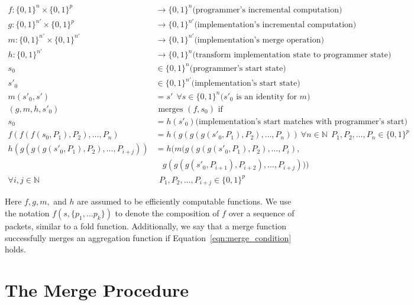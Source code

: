 \begin{align}
f : \{0, 1\}^n \times \{0, 1\}^p & \rightarrow \{0, 1\}^n \mbox{(programmer's incremental computation)} \nonumber \\
g : \{0, 1\}^{n'} \times \{0, 1\}^p  & \rightarrow \{0, 1\}^{n'} \mbox{(implementation's incremental computation)} \nonumber \\
m : \{0, 1\}^{n'} \times \{0, 1\}^{n'} & \rightarrow \{0, 1\}^{n'} \mbox{(implementation's merge operation)} \nonumber \\
h : \{0, 1\}^{n'}               & \rightarrow \{0, 1\}^n  \mbox{(transform
 implementation state to programmer state)} \nonumber \\
s_0  & \in \{0, 1\}^n \mbox{(programmer's start state)} \nonumber \\
s'_0 & \in \{0, 1\}^{n'} \mbox{(implementation's start state)} \nonumber \\
m(s'_0, s') & = s' \ \ \forall s \in \{0, 1\}^{n} \mbox{($s'_0$ is an identity for $m$)} \nonumber \\
(g, m, h, s'_0) & \mbox { merges } (f, s_0) \mbox{ if} \nonumber \\
s_0 & = h(s'_0) \mbox{(implementation's start matches with programmer's start)} \label{eqn:start_condition} \\
f(f(f(s_0, P_1), P_2), \dots, P_n) & = h(g(g(g(s'_0, P_1), P_2), \dots, P_n)) \ \forall n \in \mathbb{N} \ \ P_1, P_2, \dots, P_n \in \{0, 1\}^p \label{eqn:projection_condition} \\
h(g(g(g(s'_0, P_1), P_2), \dots, P_{i+j})) & =h( m(g(g(g(s'_0, P_1), P_2), \dots, P_{i}), \nonumber \\
&\ \ \ \ g(g(g(s'_0, P_{i+1}), P_{i+2}), \dots, P_{i+j}))) \nonumber \\
\forall i, j \in \mathbb{N} & \ \  P_1, P_2, \dots, P_{i+j} \in \{0, 1\}^p \label{eqn:merge_condition}
\end{align}

Here $f, g, m,$ and $h$ are assumed to be efficiently computable functions. We use the notation $f(s, \{p_1, \ldots p_k\})$ to denote the composition of $f$ over a sequence
of packets, similar to a fold function. Additionally, we say that a merge function successfully merges an aggregation function if Equation~\ref{eqn:merge_condition} holds. 

\section{The Merge Procedure}

